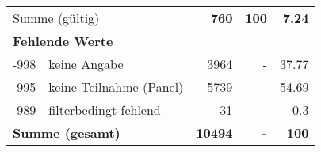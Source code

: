 \begin{longtable}{lXrrr}
     \midrule
     \multicolumn{2}{l}{Summe (gültig)} &
       \textbf{\num{760}} &
     \textbf{100} &
       \textbf{\num[round-mode=places,round-precision=2]{7,24}} \\
     \multicolumn{5}{l}{\textbf{Fehlende Werte}}\\
       -998 &
       keine Angabe &
         \num{3964} &
        - &
         \num[round-mode=places,round-precision=2]{37,77} \\
       -995 &
       keine Teilnahme (Panel) &
         \num{5739} &
        - &
         \num[round-mode=places,round-precision=2]{54,69} \\
       -989 &
       filterbedingt fehlend &
         \num{31} &
        - &
         \num[round-mode=places,round-precision=2]{0,3} \\
     \midrule
     \multicolumn{2}{l}{\textbf{Summe (gesamt)}} &
          \textbf{\num{10494}} &
        \textbf{-} &
        \textbf{100} \\
     \bottomrule
     \end{longtable}
     
